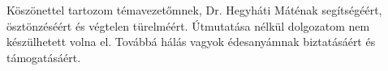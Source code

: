 Köszönettel tartozom témavezetőmnek, Dr. Hegyháti Máténak segítségéért, ösztönzéséért és végtelen türelméért. Útmutatása nélkül dolgozatom nem készülhetett volna el.
Továbbá hálás vagyok édesanyámnak biztatásáért és támogatásáért.